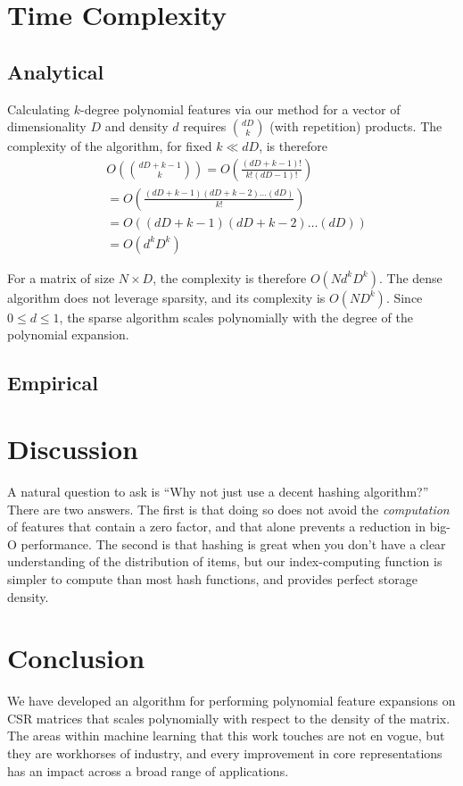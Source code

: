 \documentclass{article}
\begin{document}
\section{Time Complexity}
\subsection{Analytical}

Calculating $k$-degree polynomial features via our method for a vector of dimensionality $D$ and density $d$ requires $\binom{dD}{k}$ (with repetition) products.
The complexity of the algorithm, for fixed $k \ll dD$, is therefore
\begin{align}
& O\left(\binom{dD+k-1}{k}\right) = O\left(\frac{(dD+k-1)!}{k!(dD-1)!}\right)\\
& = O\left(\frac{(dD+k-1)(dD+k-2) \dots (dD)}{k!}\right)\\
& = O\left((dD+k-1)(dD+k-2) \dots (dD)\right)\\
& = O\left(d^kD^k\right)
\end{align}

For a matrix of size $N \times D$, the complexity is therefore $O\left(Nd^kD^k\right)$.
The dense algorithm does not leverage sparsity, and its complexity is $O\left(ND^k\right)$.
Since $0 \le d \le 1$, the sparse algorithm scales polynomially with the degree of the polynomial expansion.

\subsection{Empirical}

\section{Discussion}
A natural question to ask is ``Why not just use a decent hashing algorithm?'' There are two answers. The first is that doing so does not avoid the \emph{computation} of features that contain a zero factor, and that alone prevents a reduction in big-O performance. The second is that hashing is great when you don't have a clear understanding of the distribution of items, but our index-computing function is simpler to compute than most hash functions, and provides perfect storage density. 

\section{Conclusion}
We have developed an algorithm for performing polynomial feature expansions on CSR matrices that scales polynomially with respect to the density of the matrix.
The areas within machine learning that this work touches are not en vogue, but they are workhorses of industry, and every improvement in core representations has an impact across a broad range of applications. 



\end{document}
